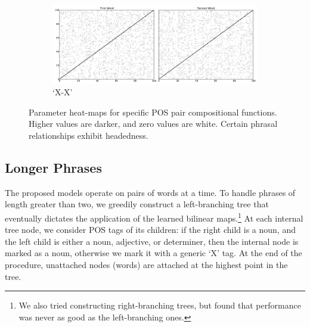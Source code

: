 \documentclass[11pt,letterpaper]{article}
\newcommand{\bW}{{\bf W}}
\begin{document}
\begin{figure}[t!]
\begin{center}
\begin{subfigure}{\columnwidth}
		\centering
		\includegraphics[width=0.95\columnwidth,keepaspectratio=true]{./x_x.pdf}	
		\caption{\small `X-X'}
		\label{fig:x_x}			
	\end{subfigure}
	\end{center}	
	\caption{Parameter heat-maps for specific POS pair compositional functions. Higher values are darker, and zero values are white. Certain phrasal relationships exhibit headedness.}
	\label{fig:heatmaps}
\end{figure}

\subsection{Longer Phrases}
\label{sec:longer-phrases}

The proposed models operate on pairs of words at a time. 
To handle phrases of length greater than two, we greedily construct a left-branching tree that eventually dictates the application of the learned bilinear maps.\footnote{We also tried constructing right-branching trees, but found that performance was never as good as the left-branching ones.}
At each internal tree node, we consider POS tags of its children: if the right child is a noun, and the left child is either a noun, adjective, or determiner, then the internal node is marked as a noun, otherwise we mark it with a generic `X' tag. 
At the end of the procedure, unattached nodes (words) are attached at the highest point in the tree. 
\end{document}
